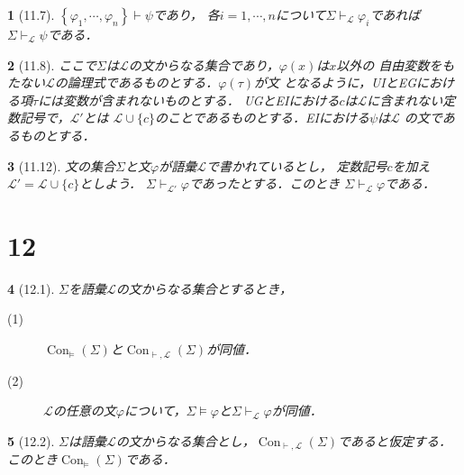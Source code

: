 \documentclass[a4j,10.5pt,oneside,openany]{jsbook}
\theoremstyle{mystyle}
\newtheorem{thm}{\color{DarkMidnightBlue}{定理}}[section]
\newcommand{\Con}{\operatorname{Con}} %
\begin{document}
	\begin{screen}
		\begin{thm}[11.7]
			$\left\{\varphi_{1},\cdots,\varphi_{n}\right\} \vdash \psi$であり，
			各$i = 1,\cdots,n$について$\Sigma \vdash_{\mathcal{L}} \varphi_{i}$であれば
			$\Sigma \vdash_{\mathcal{L}} \psi$である．
		\end{thm}
	\end{screen}
	
	\begin{screen}
		\begin{thm}[11.8]
			ここで$\Sigma$は$\mathcal{L}$の文からなる集合であり，$\varphi(x)$は$x$以外の
			自由変数をもたない$\mathcal{L}$の論理式であるものとする．$\varphi(\tau)$が文
			となるように，UIとEGにおける項$\tau$には変数が含まれないものとする．
			UGとEIにおける$c$は$\mathcal{L}$に含まれない定数記号で，$\mathcal{L}'$とは
			$\mathcal{L} \cup \{c\}$のことであるものとする．EIにおける$\psi$は$\mathcal{L}$
			の文であるものとする．
		\end{thm}
	\end{screen}
	
	\begin{screen}
		\begin{thm}[11.12]
			文の集合$\Sigma$と文$\varphi$が語彙$\mathcal{L}$で書かれているとし，
			定数記号$c$を加え$\mathcal{L}' = \mathcal{L} \cup \{c\}$としよう．
			$\Sigma \vdash_{\mathcal{L}'} \varphi$であったとする．このとき
			$\Sigma \vdash_{\mathcal{L}} \varphi$である．
		\end{thm}
	\end{screen}
	
\section{12}
	\begin{screen}
		\begin{thm}[12.1]
			$\Sigma$を語彙$\mathcal{L}$の文からなる集合とするとき，
				\begin{description}
					\item[(1)] $\Con_{\models}(\Sigma)$と$\Con_{\vdash,\mathcal{L}}(\Sigma)$が同値．
					\item[(2)] $\mathcal{L}$の任意の文$\varphi$について，$\Sigma \models
						\varphi$と$\Sigma \vdash_{\mathcal{L}} \varphi$が同値．
				\end{description}
		\end{thm}
	\end{screen}
	
	\begin{screen}
		\begin{thm}[12.2]
			$\Sigma$は語彙$\mathcal{L}$の文からなる集合とし，$\Con_{\vdash,\mathcal{L}}
			(\Sigma)$であると仮定する．このとき$\Con_{\models}(\Sigma)$である．
		\end{thm}
	\end{screen}
	
\end{document}
